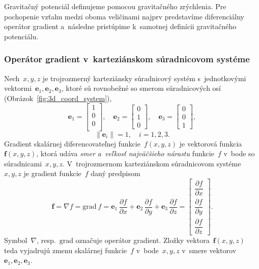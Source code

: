 \documentclass[a4paper, 12pt]{book}
\newcommand{\grad}{\mathrm{grad}}
\let\vec\mathbf
\begin{document}
Gravitačný potenciál definujeme pomocou gravitačného zrýchlenia.  Pre 
pochopenie vzťahu medzi oboma veličinami najprv predstavíme diferenciálny 
operátor gradient a~následne pristúpime k~samotnej definícii gravitačného 
potenciálu.

\subsubsection{Operátor gradient v~karteziánskom súradnicovom systéme}
\label{sec:gradient}

Nech~$x, y, z$ je trojrozmerný karteziánsky súradnicový systém s~jednotkovými 
vektormi~$\vec e_1, \vec e_2, \vec e_3$, ktoré sú rovnobežné so smerom 
súradnicových osí (Obrázok~\ref{fig:3d_coord_system}),
%
\begin{equation}
\label{eq:unit_vectors}
\vec e_1 =
\begin{bmatrix}
1\\
0\\
0\\
\end{bmatrix}
{,} \quad
%
\vec e_2 =
\begin{bmatrix}
0\\
1\\
0
\end{bmatrix}
%
{,}\quad
%
\vec e_3 =
\begin{bmatrix}
0\\
0\\
1
\end{bmatrix}
{,}
\end{equation}
%
\begin{equation}
\label{eq:unit_vectors_unit_length}
\| \vec e_i \| = 1{,} \quad i = 1, 2,3{.}
\end{equation}
%
Gradient skalárnej diferencovateľnej funkcie~$f(x, y, z)$ je vektorová 
funkcia~$\vec f(x, y, z)$, ktorá udáva \emph{smer a~veľkosť najväčšieho 
nárastu} funkcie~$f$ v~bode so súradnicami~$x, y, z$.  V~trojrozmernom 
karteziánskom súradnicovom systéme~$x, y, z$ je gradient funkcie~$f$ daný 
predpisom
%
\begin{equation}
\label{eq:gradient}
\vec f = \nabla f = \grad \ f = \vec e_1 \, \frac{\partial f}{\partial x} 
+ \vec e_2 \, \frac{\partial
f}{\partial y} + \vec e_3 \, \frac{\partial f}{\partial z} =
\begin{bmatrix}
\dfrac{\partial f}{\partial x}\\[2ex]
\dfrac{\partial f}{\partial y}\\[2ex]
\dfrac{\partial f}{\partial z}
\end{bmatrix}
{.}
\end{equation}
%
Symbol~$\nabla$, resp.~$\grad$ označuje operátor gradient.  Zložky 
vektora~$\vec f(x, y, z)$ teda vyjadrujú zmenu skalárnej funkcie~$f$ v~bode~$x, 
y, z$ v~smere vektorov~$\vec e_1, \vec e_2, \vec e_3$.
\end{document}
